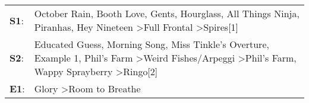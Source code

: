 \begin{supertabular}{p{0.03\textwidth}p{0.92\textwidth}}
 \textbf{S1}:  &                                            October Rain\textsuperscript{}, \enspace Booth Love\textsuperscript{}, \enspace Gents\textsuperscript{}, \enspace Hourglass\textsuperscript{}, \enspace All Things Ninja\textsuperscript{}, \enspace Piranhas\textsuperscript{}, \enspace Hey Nineteen\textsuperscript{} \textgreater \enspace Full Frontal\textsuperscript{} \textgreater \enspace Spires[1]\textsuperscript{}  \enspace  \\
 \textbf{S2}:  &  Educated Guess\textsuperscript{}, \enspace Morning Song\textsuperscript{}, \enspace Miss Tinkle's Overture\textsuperscript{}, \enspace Example 1\textsuperscript{}, \enspace Phil's Farm\textsuperscript{} \textgreater \enspace Weird Fishes/Arpeggi\textsuperscript{} \textgreater \enspace Phil's Farm\textsuperscript{}, \enspace Wappy Sprayberry\textsuperscript{} \textgreater \enspace Ringo[2]\textsuperscript{}  \enspace  \\
 \textbf{E1}:  &                                                                                                                                                                                                                                                                                                                                            Glory\textsuperscript{} \textgreater \enspace Room to Breathe\textsuperscript{}  \enspace  \\
\end{supertabular}
